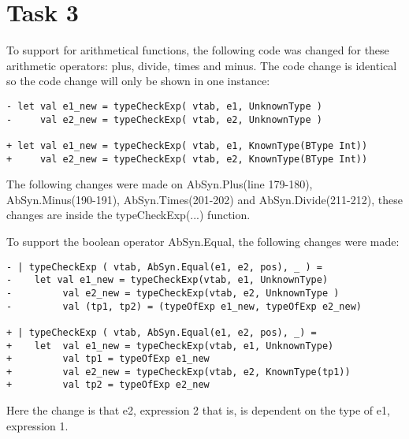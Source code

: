 \section{Task 3}
To support for arithmetical functions, the following code was changed for these
arithmetic operators: plus, divide, times and minus. The code change is
identical so the code change will only be shown in one instance:
\begin{verbatim}
- let val e1_new = typeCheckExp( vtab, e1, UnknownType )
-     val e2_new = typeCheckExp( vtab, e2, UnknownType )

+ let val e1_new = typeCheckExp( vtab, e1, KnownType(BType Int))
+     val e2_new = typeCheckExp( vtab, e2, KnownType(BType Int))
\end{verbatim}

The following changes were made on AbSyn.Plus(line 179-180), AbSyn.Minus(190-191),
AbSyn.Times(201-202) and AbSyn.Divide(211-212), these changes are inside the
typeCheckExp(...) function.

To support the boolean operator AbSyn.Equal, the following changes were made:
\begin{verbatim}
- | typeCheckExp ( vtab, AbSyn.Equal(e1, e2, pos), _ ) =
-    let val e1_new = typeCheckExp(vtab, e1, UnknownType)
-         val e2_new = typeCheckExp(vtab, e2, UnknownType )
-         val (tp1, tp2) = (typeOfExp e1_new, typeOfExp e2_new)

+ | typeCheckExp ( vtab, AbSyn.Equal(e1, e2, pos), _) =
+    let  val e1_new = typeCheckExp(vtab, e1, UnknownType)
+         val tp1 = typeOfExp e1_new
+         val e2_new = typeCheckExp(vtab, e2, KnownType(tp1))
+         val tp2 = typeOfExp e2_new 
\end{verbatim}

Here the change is that e2, expression 2 that is, is dependent on the type of
e1, expression 1.\\
\\


